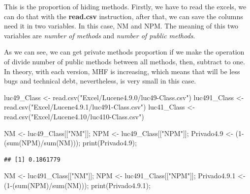 \documentclass[
]{article}
\newenvironment{Shaded}{\begin{snugshade}}{\end{snugshade}}
\newcommand{\DecValTok}[1]{\textcolor[rgb]{0.00,0.00,0.81}{#1}}
\newcommand{\FloatTok}[1]{\textcolor[rgb]{0.00,0.00,0.81}{#1}}
\newcommand{\FunctionTok}[1]{\textcolor[rgb]{0.00,0.00,0.00}{#1}}
\newcommand{\NormalTok}[1]{#1}
\newcommand{\OtherTok}[1]{\textcolor[rgb]{0.56,0.35,0.01}{#1}}
\newcommand{\SpecialCharTok}[1]{\textcolor[rgb]{0.00,0.00,0.00}{#1}}
\newcommand{\StringTok}[1]{\textcolor[rgb]{0.31,0.60,0.02}{#1}}
\begin{document}
This is the proportion of hiding methods. Firstly, we have to read the
excels, we can do that with the \textbf{read.csv} instruction, after
that, we can save the columns need it in two variables. In this case, NM
and NPM. The meaning of this two variables are \emph{number of methods}
and \emph{number of public methods}.

As we can see, we can get private methods proportion if we make the
operation of divide number of public methods between all methods, then,
subtract to one. In theory, with each version, MHF is increasing, which
means that will be less bugs and technical debt, nevertheless, is very
small in this case.

\begin{Shaded}
\begin{Highlighting}[]
\NormalTok{luc49\_Class  }\OtherTok{\textless{}{-}} \FunctionTok{read.csv}\NormalTok{(}\StringTok{"Excel/Lucene4.9.0/luc49{-}Class.csv"}\NormalTok{) }
\NormalTok{luc491\_Class  }\OtherTok{\textless{}{-}} \FunctionTok{read.csv}\NormalTok{(}\StringTok{"Excel/Lucene4.9.1/luc491{-}Class.csv"}\NormalTok{) }
\NormalTok{luc41\_Class  }\OtherTok{\textless{}{-}} \FunctionTok{read.csv}\NormalTok{(}\StringTok{"Excel/Lucene4.10/luc410{-}Class.csv"}\NormalTok{) }

\NormalTok{NM }\OtherTok{\textless{}{-}}\NormalTok{ luc49\_Class[[}\StringTok{"NM"}\NormalTok{]];}
\NormalTok{NPM }\OtherTok{\textless{}{-}}\NormalTok{ luc49\_Class[[}\StringTok{"NPM"}\NormalTok{]];}
\NormalTok{Privado4}\FloatTok{.9} \OtherTok{\textless{}{-}}\NormalTok{ (}\DecValTok{1}\SpecialCharTok{{-}}\NormalTok{(}\FunctionTok{sum}\NormalTok{(NPM)}\SpecialCharTok{/}\FunctionTok{sum}\NormalTok{(NM)));}
\FunctionTok{print}\NormalTok{(Privado4}\FloatTok{.9}\NormalTok{);}
\end{Highlighting}
\end{Shaded}

\begin{verbatim}
## [1] 0.1861779
\end{verbatim}

\begin{Shaded}
\begin{Highlighting}[]
\NormalTok{NM }\OtherTok{\textless{}{-}}\NormalTok{ luc491\_Class[[}\StringTok{"NM"}\NormalTok{]];}
\NormalTok{NPM }\OtherTok{\textless{}{-}}\NormalTok{ luc491\_Class[[}\StringTok{"NPM"}\NormalTok{]];}
\NormalTok{Privado4.}\FloatTok{9.1} \OtherTok{\textless{}{-}}\NormalTok{ (}\DecValTok{1}\SpecialCharTok{{-}}\NormalTok{(}\FunctionTok{sum}\NormalTok{(NPM)}\SpecialCharTok{/}\FunctionTok{sum}\NormalTok{(NM)));}
\FunctionTok{print}\NormalTok{(Privado4.}\FloatTok{9.1}\NormalTok{);}
\end{Highlighting}
\end{Shaded}
\end{document}
